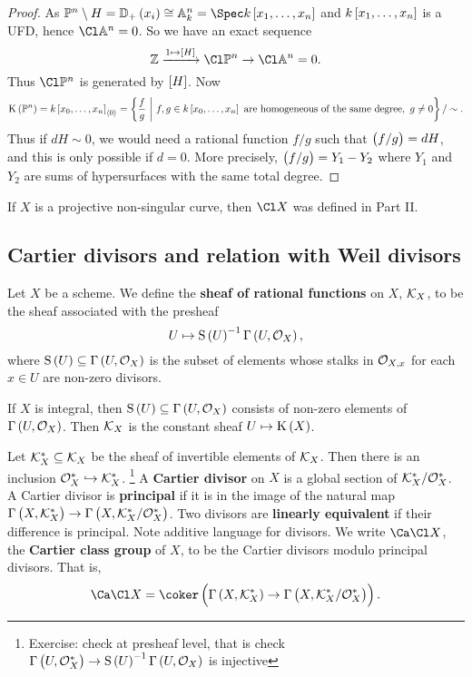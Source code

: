 \begin{proof}
As $ \PP^n \setminus H = \DD_+\br{x_i} \cong \AA_k^n = \Spec k\sbr{x_1, \dots, x_n} $ and $ k\sbr{x_1, \dots, x_n} $ is a UFD, hence $ \Cl \AA^n = 0 $. So we have an exact sequence
$$ \ZZ \xrightarrow{1 \mapsto \sbr{H}} \Cl \PP^n \to \Cl \AA^n = 0. $$
Thus $ \Cl \PP^n $ is generated by $ \sbr{H} $. Now
$$ \K\br{\PP^n} = k\sbr{x_0, \dots, x_n}_{\abr{0}} = \cbr{\dfrac{f}{g} \st f, g \in k\sbr{x_0, \dots, x_n} \ \text{are homogeneous of the same degree}, \ g \ne 0} / \sim. $$
Thus if $ dH \sim 0 $, we would need a rational function $ f / g $ such that $ \br{f / g} = dH $, and this is only possible if $ d = 0 $. More precisely, $ \br{f / g} = Y_1 - Y_2 $ where $ Y_1 $ and $ Y_2 $ are sums of hypersurfaces with the same total degree.
\end{proof}

\begin{remark*}
If $ X $ is a projective non-singular curve, then $ \Cl X $ was defined in Part II.
\end{remark*}

\subsection{Cartier divisors and relation with Weil divisors}

\begin{definition*}
Let $ X $ be a scheme. We define the \textbf{sheaf of rational functions} on $ X $, $ \mathcal{K}_X $, to be the sheaf associated with the presheaf
$$ U \mapsto \S\br{U}^{-1}\Gamma\br{U, \OOO_X}, $$
where $ \S\br{U} \subseteq \Gamma\br{U, \OOO_X} $ is the subset of elements whose stalks in $ \mathcal{O}_{X, x} $ for each $ x \in U $ are non-zero divisors.
\end{definition*}

\begin{example*}
If $ X $ is integral, then $ \S\br{U} \subseteq \Gamma\br{U, \OOO_X} $ consists of non-zero elements of $ \Gamma\br{U, \OOO_X} $. Then $ \mathcal{K}_X $ is the constant sheaf $ U \mapsto \K\br{X} $.
\end{example*}

\begin{definition*}
Let $ \mathcal{K}_X^* \subseteq \mathcal{K}_X $ be the sheaf of invertible elements of $ \mathcal{K}_X $. Then there is an inclusion $ \mathcal{O}_X^* \hookrightarrow \mathcal{K}_X^* $. \footnote{Exercise: check at presheaf level, that is check $ \Gamma\br{U, \OOO_X^*} \to \S\br{U}^{-1}\Gamma\br{U, \OOO_X} $ is injective} A \textbf{Cartier divisor} on $ X $ is a global section of $ \mathcal{K}_X^* / \mathcal{O}_X^* $. A Cartier divisor is \textbf{principal} if it is in the image of the natural map $ \Gamma\br{X, \KKK_X^*} \to \Gamma\br{X, \KKK_X^* / \OOO_X^*} $. Two divisors are \textbf{linearly equivalent} if their difference is principal. Note additive language for divisors. We write $ \Ca\Cl X $, the \textbf{Cartier class group} of $ X $, to be the Cartier divisors modulo principal divisors. That is,
$$ \Ca\Cl X = \coker \br{\Gamma\br{X, \KKK_X^*} \to \Gamma\br{X, \KKK_X^* / \OOO_X^*}}. $$
\end{definition*}

